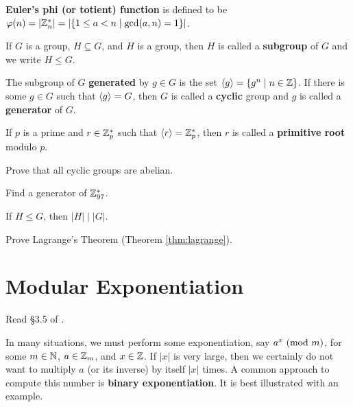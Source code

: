 \begin{definition}
{\bf Euler's phi (or totient) function} is defined to be $\varphi(n) = |\mathbb{Z}_n^*| = |\{1\le a <n \mid \gcd(a, n)=1\}|$.
\end{definition}

\begin{definition}
If $G$ is a group, $H\subseteq G$, and $H$ is a group, then $H$ is called a {\bf subgroup} of $G$ and we write $H \le G$.
\end{definition}

\begin{definition}
	The subgroup of $G$ {\bf generated} by $g\in G$ is the set $\left\langle g\right\rangle = \{g^n \mid n\in\mathbb{Z}\}$. If there is some $g\in G$ such that $\left\langle g\right\rangle = G$, then $G$ is called a {\bf cyclic} group and $g$ is called a {\bf generator} of $G$.
\end{definition}

\begin{definition}
	If $p$ is a prime and $r\in\mathbb{Z}_p^*$ such that $\left\langle r\right\rangle=\mathbb{Z}_p^*$, then $r$ is called a {\bf primitive root} modulo $p$.
\end{definition}

\begin{problem}  [15 points]
Prove that all cyclic groups are abelian.
\end{problem}

\begin{problem}  [10 points]
Find a generator of $\mathbb{Z}_{97}^*$.
\end{problem}

\begin{theorem}[Lagrange]
\label{thm:lagrange}
If $H\le G$, then $|H|\mid |G|$.
\end{theorem}

\begin{problem}[15 points]
Prove Lagrange's Theorem (Theorem \ref{thm:lagrange}).
\end{problem}


	\section{Modular Exponentiation}

	Read \S 3.5 of \cite {tw}.

	In many situations, we must perform some exponentiation, say $a^x \mbox{\ $\left(\mathrm{mod}\ {m}\right)$}$, for some $m\in\mathbb{N}$, $a\in\mathbb{Z}_m$, and $x\in\mathbb{Z}$. If $|x|$ is very large, then we certainly do not want to multiply $a$ (or its inverse) by itself $|x|$ times. A common approach to compute this number is {\bf binary exponentiation}. It is best illustrated with an example.

